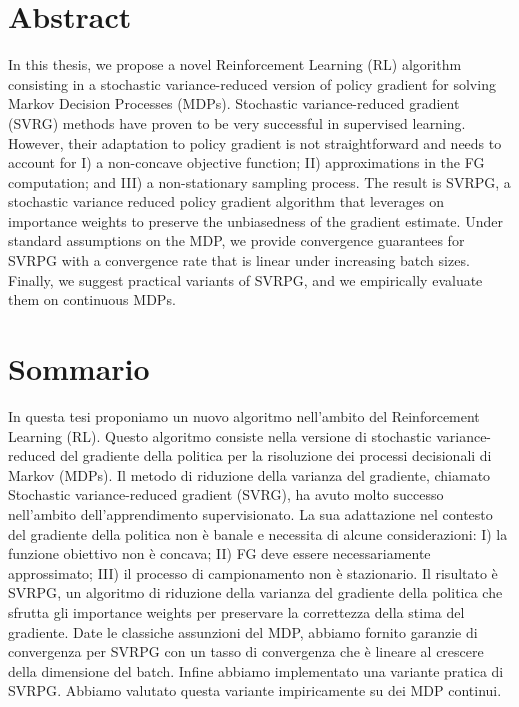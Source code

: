 
\begingroup
\let\clearpage\relax
\let\cleardoublepage\relax
\let\cleardoublepage\relax

\chapter*{Abstract}
In this thesis, we propose a novel Reinforcement Learning (\acs{RL}) algorithm consisting in a stochastic variance-reduced version of policy gradient for solving Markov Decision Processes (\acs{MDP}s).\newline
Stochastic variance-reduced gradient (\acs{SVRG}) methods have proven to be very successful in supervised learning. However, their adaptation to policy gradient is not straightforward and needs to account for I) a non-concave objective function; II) approximations in the \ac{FG} computation; and III) a non-stationary sampling process. The result is \acs{SVRPG}, a stochastic variance reduced policy gradient algorithm that leverages on importance weights to preserve the unbiasedness of the gradient estimate. Under standard assumptions on the \acs{MDP}, we provide convergence guarantees for \acs{SVRPG} with a convergence rate that is linear under increasing batch sizes. Finally, we suggest practical variants of \acs{SVRPG}, and we empirically evaluate them on continuous \acs{MDP}s.

\vfill
\newpage
{}
\chapter*{Sommario}
In questa tesi proponiamo un nuovo algoritmo nell'ambito del Reinforcement Learning (\acs{RL}). Questo algoritmo consiste  nella versione di stochastic variance-reduced del gradiente della politica per la risoluzione dei processi decisionali di Markov (\acs{MDP}s).\newline
Il metodo di riduzione della varianza del gradiente, chiamato Stochastic variance-reduced gradient (\acs{SVRG}), ha avuto molto successo nell'ambito dell'apprendimento supervisionato. La sua adattazione nel contesto del gradiente della politica non è banale e necessita di alcune considerazioni: I) la funzione obiettivo non è concava; II) \acs{FG} deve essere necessariamente approssimato;  III) il processo di campionamento non è stazionario. Il risultato è \acs{SVRPG}, un algoritmo di riduzione della varianza del gradiente della politica che sfrutta gli importance weights per preservare la correttezza della stima del gradiente. Date le classiche assunzioni del \acs{MDP}, abbiamo fornito garanzie di convergenza per \acs{SVRPG} con un tasso di convergenza che è lineare al crescere della dimensione del batch. Infine abbiamo implementato una variante pratica di \acs{SVRPG}. Abbiamo valutato questa variante impiricamente  su dei \acs{MDP} continui.

\endgroup